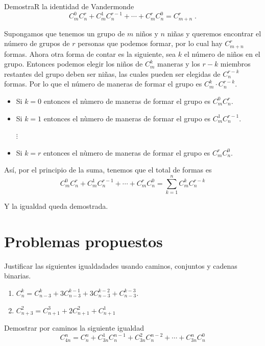 \documentclass[12pt]{article}
\begin{document}
\begin{ejemplo}
    DemostraR la identidad de Vandermonde
    \[C^0_mC^r_n+C^1_mC^{r-1}_n+\cdots+C^r_mC^0_n=C^r_{m+n}\;.\]
\end{ejemplo}

\begin{solucion}
Supongamos que tenemos un grupo de $m$ niños y $n$ niñas y queremos encontrar el número de grupos de $r$ personas que
podemos formar, por lo cual hay $C^r_{m+n}$ formas. Ahora otra forma de contar es la siguiente, sea $k$ el número de niños en el grupo. Entonces podemos elegir los niños de $C^k_m$ maneras y los $r-k$ miembros restantes del grupo deben ser niñas, las cuales pueden ser elegidas de $C^{r-k}_n$ formas. Por lo que el número de maneras de formar el grupo es $C^k_m\cdot C^{r-k}_n$.
\begin{itemize}
    \item Si $k=0$ entonces el nùmero de maneras de formar el grupo es $C^0_mC^r_n$.
    \item Si $k=1$ entonces el nùmero de maneras de formar el grupo es $C^1_mC^{r-1}_n$.
    \begin{center}
        $\vdots$
    \end{center}
    \item Si $k=r$ entonces el nùmero de maneras de formar el grupo es $C^r_mC^0_n$.
\end{itemize}
Así, por el principio de la suma, tenemos que el total de formas es
\[C^0_mC^r_n+C^1_mC^{r-1}_n+\cdots +C^r_mC^0_n=\sum_{k=1}^nC^k_mC^{r-k}_n\]
\end{solucion}
Y la igualdad queda demostrada.
\section{Problemas propuestos}
\begin{problema}
    Justificar las siguientes igualdadades usando caminos, conjuntos y cadenas binarias.
    \begin{enumerate}
        \item $\displaystyle C^k_n=C^k_{n-3}+3C^{k-1}_{n-3}+3C^{k-2}_{n-3}+C^{k-3}_{n-3}$.
        \item $\displaystyle C^2_{n+3}=C^3_{n+1}+2C^2_{n+1}+C^1_{n+1}$
    \end{enumerate}
\end{problema}

\begin{problema}
    Demostrar por caminos la siguiente igualdad
    \[C^n_{4n}=C^n_n+C^1_{3n}C^{n-1}_n+C^2_{3n}C^{n-2}_{n}+\cdots +C^n_{3n}C^0_n\]
\end{problema}
\end{document}
